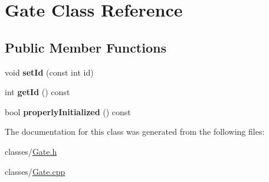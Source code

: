 \hypertarget{class_gate}{}\section{Gate Class Reference}
\label{class_gate}
\subsection*{Public Member Functions}
\begin{DoxyCompactItemize}
\item 
\mbox{\label{class_gate_aa770ce8dbc324b0c44c1345bb1e77672}} 
void {\bfseries set\+Id} (const int id)
\item 
\mbox{\label{class_gate_a9ba3d9aa4f60f5b97a1fb391b7490938}} 
int {\bfseries get\+Id} () const
\item 
\mbox{\label{class_gate_a51a6794e1e26f03c75f469a6ee8d3432}} 
bool {\bfseries properly\+Initialized} () const
\end{DoxyCompactItemize}


The documentation for this class was generated from the following files\+:\begin{DoxyCompactItemize}
\item 
classes/\mbox{\hyperlink{_gate_8h}{Gate.\+h}}\item 
classes/\mbox{\hyperlink{_gate_8cpp}{Gate.\+cpp}}\end{DoxyCompactItemize}
